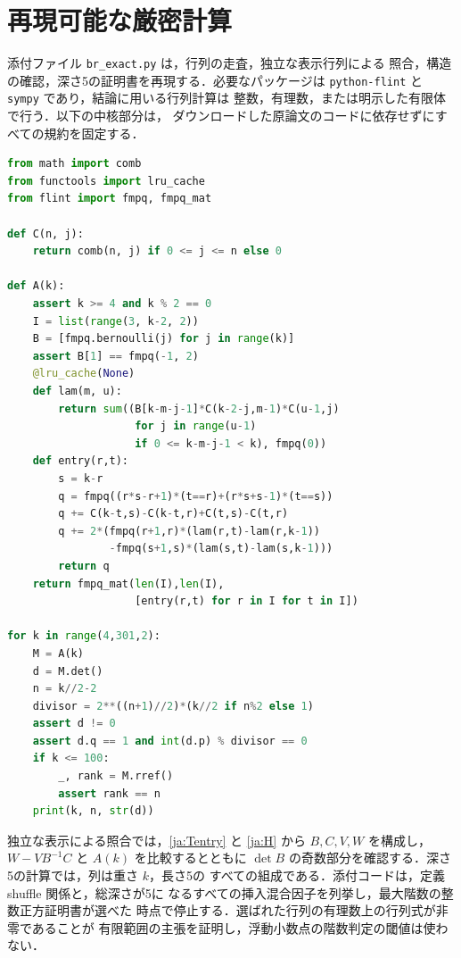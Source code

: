 \documentclass[12pt]{amsart}
\theoremstyle{definition}
\theoremstyle{remark}
\numberwithin{equation}{section}
\theoremstyle{definition}
\theoremstyle{remark}
\begin{document}
\section{再現可能な厳密計算}
添付ファイル \texttt{br\_exact.py} は，行列の走査，独立な表示行列による
照合，構造の確認，深さ5の証明書を再現する．必要なパッケージは
\texttt{python-flint} と \texttt{sympy} であり，結論に用いる行列計算は
整数，有理数，または明示した有限体で行う．以下の中核部分は，
ダウンロードした原論文のコードに依存せずにすべての規約を固定する．
\begin{lstlisting}[language=Python]
from math import comb
from functools import lru_cache
from flint import fmpq, fmpq_mat

def C(n, j):
    return comb(n, j) if 0 <= j <= n else 0

def A(k):
    assert k >= 4 and k % 2 == 0
    I = list(range(3, k-2, 2))
    B = [fmpq.bernoulli(j) for j in range(k)]
    assert B[1] == fmpq(-1, 2)
    @lru_cache(None)
    def lam(m, u):
        return sum((B[k-m-j-1]*C(k-2-j,m-1)*C(u-1,j)
                    for j in range(u-1)
                    if 0 <= k-m-j-1 < k), fmpq(0))
    def entry(r,t):
        s = k-r
        q = fmpq((r*s-r+1)*(t==r)+(r*s+s-1)*(t==s))
        q += C(k-t,s)-C(k-t,r)+C(t,s)-C(t,r)
        q += 2*(fmpq(r+1,r)*(lam(r,t)-lam(r,k-1))
                -fmpq(s+1,s)*(lam(s,t)-lam(s,k-1)))
        return q
    return fmpq_mat(len(I),len(I),
                    [entry(r,t) for r in I for t in I])

for k in range(4,301,2):
    M = A(k)
    d = M.det()
    n = k//2-2
    divisor = 2**((n+1)//2)*(k//2 if n%2 else 1)
    assert d != 0
    assert d.q == 1 and int(d.p) % divisor == 0
    if k <= 100:
        _, rank = M.rref()
        assert rank == n
    print(k, n, str(d))
\end{lstlisting}
独立な表示による照合では，\eqref{ja:Tentry} と \eqref{ja:H} から
$B,C,V,W$ を構成し，$W-VB^{-1}C$ と $A(k)$ を比較するとともに
$\det B$ の奇数部分を確認する．深さ5の計算では，列は重さ $k$，長さ5の
すべての組成である．添付コードは，定義 shuffle 関係と，総深さが5に
なるすべての挿入混合因子を列挙し，最大階数の整数正方証明書が選べた
時点で停止する．選ばれた行列の有理数上の行列式が非零であることが
有限範囲の主張を証明し，浮動小数点の階数判定の閾値は使わない．
\end{document}
